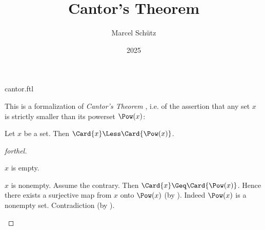 \documentclass{stex}
\title{Cantor's Theorem}
\author{Marcel Schütz}
\date{2025}
\begin{document}
\begin{smodule}{cantor.ftl}



\maketitle

\noindent This is a formalization of \emph{Cantor's Theorem}
\cite{Cantor1891}, i.e. of the assertion that any set $x$ is strictly smaller
than its powerset $\Pow(x)$:

\begin{theorem}[forthel,title=Cantor's Theorem,name=Cantor II]
  Let $x$ be a set.
  Then $\Card{x} \Less \Card{\Pow(x)}$.
\end{theorem}
\begin{proof}[forthel]
  \begin{case}{$x$ is empty.} \end{case}

  \begin{case}{$x$ is nonempty.}
    Assume the contrary.
    Then $\Card{x} \Geq \Card{\Pow(x)}$.
    Hence there exists a surjective map from $x$ onto $\Pow(x)$ (by ).
    Indeed $\Pow(x)$ is a nonempty set.
    Contradiction (by ).
  \end{case}
\end{proof}

\printbibliography
{}

\end{smodule}
\end{document}
